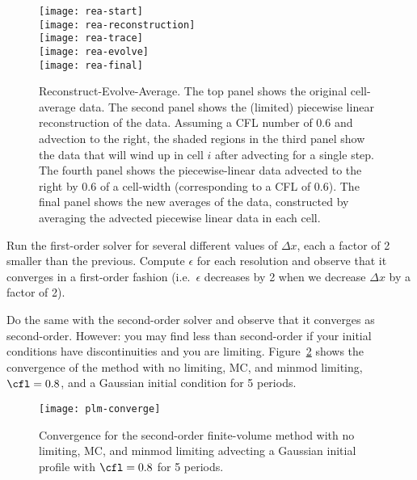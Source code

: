 \begin{figure}
\centering
\texttt{[image: rea-start]} \\
\texttt{[image: rea-reconstruction]} \\
\texttt{[image: rea-trace]} \\
\texttt{[image: rea-evolve]} \\
\texttt{[image: rea-final]}
\caption[The Reconstruct-Evolve-Average procedure]{\label{fig:rea}
  Reconstruct-Evolve-Average.  The top panel shows the original
  cell-average data.  The second panel shows the (limited) piecewise
  linear reconstruction of the data.  Assuming a CFL number of 0.6 and
  advection to the right, the shaded regions in the third panel show
  the data that will wind up in cell $i$ after advecting for a single
  step.  The fourth panel shows the piecewise-linear data advected to
  the right by 0.6 of a cell-width (corresponding to a CFL of 0.6).
  The final panel shows the new averages of the data, constructed by
  averaging the advected piecewise linear data in each cell.}
\end{figure}


\begin{exercise}
{ Run the first-order solver for several different values of $\Delta x$,
each a factor of 2 smaller than the previous.  Compute $\epsilon$ for
each resolution and observe that it converges in a first-order fashion
(i.e.\ $\epsilon$ decreases by 2 when we decrease $\Delta x$ by a factor of 2).

\noindent Do the same with the second-order solver and observe that it
converges as second-order. However: you may find less than
second-order if your initial conditions have discontinuities and you
are limiting.  Figure~\ref{fig:advnorm} shows the convergence of the
method with no limiting, MC, and minmod limiting, $\cfl = 0.8$, and a
Gaussian initial condition for 5 periods.}
\end{exercise}

\begin{figure}[t]
\centering
\texttt{[image: plm-converge]}
\caption[Convergence of second-order finite-volume advection]
        {\label{fig:advnorm} Convergence for the second-order
          finite-volume method with no limiting, MC, and minmod limiting advecting a
          Gaussian initial profile with $\cfl = 0.8$ for 5 periods. \\
        }
\end{figure}


